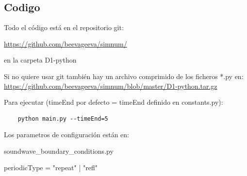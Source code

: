 \documentclass{article}
\begin{document}
\subsection{Codigo}
\begin{description}
\item  Todo el código está en el repositorio git:

\href{https://github.com/beevageeva/simnum/}{https://github.com/beevageeva/simnum/}

en la carpeta D1-python
\item Si no quiere usar git también hay un archivo comprimido de los ficheros *.py en:
\href{https://github.com/beevageeva/simnum/blob/master/D1-python.tar.gz}{https://github.com/beevageeva/simnum/blob/master/D1-python.tar.gz}

\item Para ejecutar (timeEnd por defecto = timeEnd definido en constants.py):
\begin{verbatim}
	python main.py --timeEnd=5
\end{verbatim}

\item Los parametros de configuración están en:
\begin{description}
\item soundwave\_boundary\_conditions.py 
\begin{description}
	\item periodicType = "repeat" | "refl"
\end{description}


\end{description}
\end{description}
\end{document}

